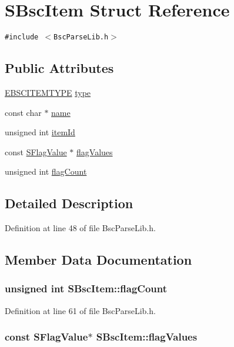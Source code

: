 \hypertarget{struct_s_bsc_item}{
\section{SBscItem Struct Reference}
\label{struct_s_bsc_item}
}
{\tt \#include $<$BscParseLib.h$>$}

\subsection*{Public Attributes}
\begin{CompactItemize}
\item 
\hyperlink{_bsc_parse_lib_8h_7321d18d9bef2ff4ce8a9b26574f4a53}{EBSCITEMTYPE} \hyperlink{struct_s_bsc_item_b676ba2550ae03c2b67579c7e48969b6}{type}
\item 
const char $\ast$ \hyperlink{struct_s_bsc_item_d041cf6e983e48f09227b82c1709ffe7}{name}
\item 
unsigned int \hyperlink{struct_s_bsc_item_eeee5502b47e2983493a094bd2b90e50}{itemId}
\item 
const \hyperlink{struct_s_flag_value}{SFlagValue} $\ast$ \hyperlink{struct_s_bsc_item_b5390e52af5bb2f69abafb0c86ff46af}{flagValues}
\item 
unsigned int \hyperlink{struct_s_bsc_item_94d2571787354dd30b2c1561ceeb6c65}{flagCount}
\end{CompactItemize}


\subsection{Detailed Description}


Definition at line 48 of file BscParseLib.h.

\subsection{Member Data Documentation}
\hypertarget{struct_s_bsc_item_94d2571787354dd30b2c1561ceeb6c65}{
\subsubsection[{flagCount}]{\setlength{\rightskip}{0pt plus 5cm}unsigned int {\bf SBscItem::flagCount}}}
\label{struct_s_bsc_item_94d2571787354dd30b2c1561ceeb6c65}




Definition at line 61 of file BscParseLib.h.\hypertarget{struct_s_bsc_item_b5390e52af5bb2f69abafb0c86ff46af}{
\subsubsection[{flagValues}]{\setlength{\rightskip}{0pt plus 5cm}const {\bf SFlagValue}$\ast$ {\bf SBscItem::flagValues}}}
\label{struct_s_bsc_item_b5390e52af5bb2f69abafb0c86ff46af}




